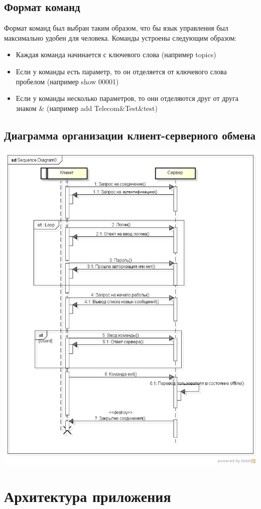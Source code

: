 \documentclass[10pt,a4paper]{report}
\begin{document}
\section{Формат команд}
Формат команд был выбран таким образом, что бы язык управления был максимально удобен для человека. Команды устроены следующим образом:
\begin{itemize}
\item Каждая команда начинается с ключевого слова (например topics)
\item Если у команды есть параметр, то он отделяется от ключевого слова пробелом (например show 00001)
\item Если у команды несколько параметров, то они отделяются друг от друга знаком \& (например add Telecom\&Test\&test)
\end{itemize}
\section{Диаграмма организации клиент-серверного обмена}
\includegraphics[scale=0.5]{diagram}
\chapter{Архитектура приложения}
\end{document}
